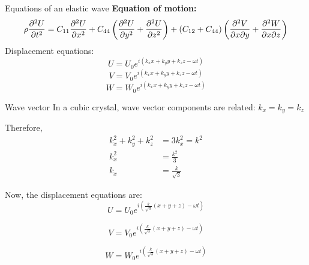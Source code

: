 \documentclass[aspectratio=43]{beamer}
\begin{document}
\begin{frame}{Equations of an elastic wave}
    \textbf{Equation of motion:}
    \begin{equation}\notag
        \rho \frac{\partial^2 U}{\partial t^2} = C_{11} \frac{\partial^2 U}{\partial x^2} + C_{44} \left(\frac{\partial^2 U}{\partial y^2} + \frac{\partial^2 U}{\partial z^2}\right) + (C_{12} + C_{44})\left(\frac{\partial^2 V}{\partial x \partial y} + \frac{\partial^2 W}{\partial x \partial z}\right)
    \end{equation}
    Displacement equations:
    \begin{equation}
        U = U_0 e^{i(k_x x + k_y y + k_z z - \omega t)}
    \end{equation}
    \begin{equation}
        V = V_0 e^{i(k_x x + k_y y + k_z z - \omega t)}
    \end{equation}
        \begin{equation}
        W = W_0 e^{i(k_x x + k_y y + k_z z - \omega t)}
    \end{equation}
\end{frame}

 
\begin{frame}{Wave vector} 
In a cubic crystal, wave vector components are related: $k_x = k_y =k_z$

Therefore,
\begin{align*}
k_x^2 + k_y^2 + k_z^2 &= 3 k_x^2 = k^2\\
k_x^2 & = \frac{k^2}{3}\\
k_x & = \frac{k}{\sqrt{3}}
\end{align*}

Now, the displacement equations are: 
\begin{equation}
    \tag{3}
    U =  U_0 e^{i\left(\frac{k}{\sqrt{3}}(x+y+z) - \omega t\right)}
    \label{eq3}
\end{equation}

\begin{equation}
    \tag{4}
    V =  V_0 e^{i\left(\frac{k}{\sqrt{3}}(x+y+z) - \omega t\right)}
    \label{eq4}
\end{equation}

\begin{equation}
    \tag{5}
    W =  W_0 e^{i\left(\frac{k}{\sqrt{3}}(x+y+z) - \omega t\right)}
    \label{eq5}
\end{equation}
\end{frame}
\end{document}
